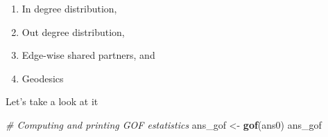 \documentclass[]{book}
\newenvironment{Shaded}{\begin{snugshade}}{\end{snugshade}}
\newcommand{\KeywordTok}[1]{\textcolor[rgb]{0.13,0.29,0.53}{\textbf{#1}}}
\newcommand{\StringTok}[1]{\textcolor[rgb]{0.31,0.60,0.02}{#1}}
\newcommand{\CommentTok}[1]{\textcolor[rgb]{0.56,0.35,0.01}{\textit{#1}}}
\newcommand{\NormalTok}[1]{#1}
\providecommand{\tightlist}{%
  \setlength{\itemsep}{0pt}\setlength{\parskip}{0pt}}
\theoremstyle{definition}
\theoremstyle{definition}
\theoremstyle{definition}
\theoremstyle{remark}
\begin{document}
\begin{enumerate}
\def\labelenumi{\alph{enumi}.}
\tightlist
\item
  In degree distribution,
\item
  Out degree distribution,
\item
  Edge-wise shared partners, and
\item
  Geodesics
\end{enumerate}

Let's take a look at it

\begin{Shaded}
\begin{Highlighting}[]
\CommentTok{# Computing and printing GOF estatistics}
\NormalTok{ans_gof <-}\StringTok{ }\KeywordTok{gof}\NormalTok{(ans0)}
\NormalTok{ans_gof}
\end{Highlighting}
\end{Shaded}
\end{document}

